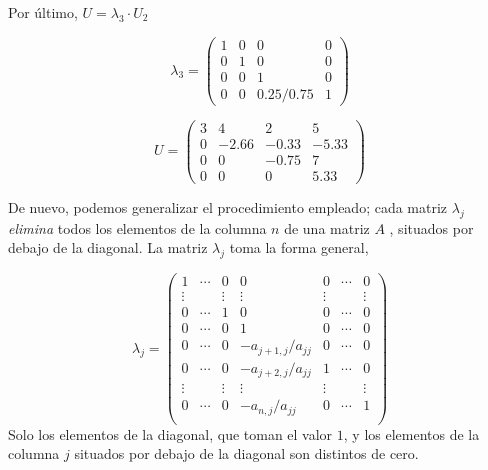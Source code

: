 Por último, $U=\lambda_3 \cdot U_2$

\begin{equation*}
 \lambda_3 =\begin{pmatrix}
1& 0& 0&0\\
0& 1& 0& 0\\
0& 0& 1& 0\\
0& 0& 0.25/0.75 & 1
\end{pmatrix}
\end{equation*}

\begin{equation*}
 U =\begin{pmatrix}
3& 4& 2&5\\
0& -2.66& -0.33& -5.33\\
0& 0& -0.75& 7\\
0& 0& 0& 5.33
\end{pmatrix}
\end{equation*}

De nuevo, podemos generalizar el procedimiento empleado; cada matriz $\lambda_j$ \emph{elimina} todos los elementos de la columna $n$ de una matriz $A$ , situados por debajo de la diagonal. La  matriz $\lambda_j$  toma la forma general,

\begin{equation*}
\lambda_j=\begin{pmatrix}
1& \cdots & 0& 0& 0& \cdots & 0\\
 \vdots &  &  \vdots & \vdots &  \vdots & & \vdots\\
0& \cdots & 1& 0& 0& \cdots & 0\\
0& \cdots & 0& 1& 0& \cdots & 0\\
0& \cdots &0 & -a_{j+1,j}/a_{jj}& 0& \cdots & 0\\
0& \cdots &0 & -a_{j+2,j}/a_{jj}& 1& \cdots & 0\\
 \vdots &  &  \vdots & \vdots &  \vdots & & \vdots\\
0& \cdots & 0& -a_{n,j}/a_{jj}& 0&\cdots & 1\\
\end{pmatrix}
\end{equation*} 
Solo los elementos de la diagonal, que toman el valor $1$, y los elementos de la columna $j$ situados por debajo de la diagonal son distintos de cero.

